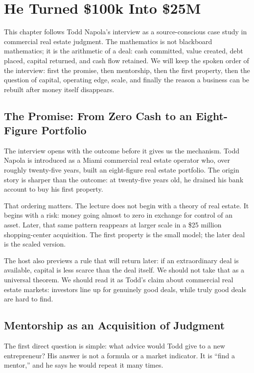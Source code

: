 \chapter{He Turned \$100k Into \$25M}

This chapter follows Todd Napola's interview as a source-conscious case study in commercial real estate judgment. The mathematics is not blackboard mathematics; it is the arithmetic of a deal: cash committed, value created, debt placed, capital returned, and cash flow retained. We will keep the spoken order of the interview: first the promise, then mentorship, then the first property, then the question of capital, operating edge, scale, and finally the reason a business can be rebuilt after money itself disappears.

\section{The Promise: From Zero Cash to an Eight-Figure Portfolio}

The interview opens with the outcome before it gives us the mechanism. Todd Napola is introduced as a Miami commercial real estate operator who, over roughly twenty-five years, built an eight-figure real estate portfolio. The origin story is sharper than the outcome: at twenty-five years old, he drained his bank account to buy his first property.

That ordering matters. The lecture does not begin with a theory of real estate. It begins with a risk: money going almost to zero in exchange for control of an asset. Later, that same pattern reappears at larger scale in a \$25 million shopping-center acquisition. The first property is the small model; the later deal is the scaled version.

The host also previews a rule that will return later: if an extraordinary deal is available, capital is less scarce than the deal itself. We should not take that as a universal theorem. We should read it as Todd's claim about commercial real estate markets: investors line up for genuinely good deals, while truly good deals are hard to find.

\section{Mentorship as an Acquisition of Judgment}

The first direct question is simple: what advice would Todd give to a new entrepreneur? His answer is not a formula or a market indicator. It is ``find a mentor,'' and he says he would repeat it many times.

